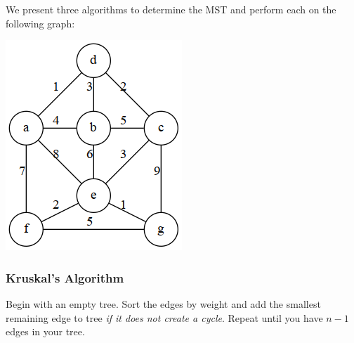 \documentclass[a4paper]{article}
\theoremstyle{definition}
\begin{document}
We present three algorithms to determine the MST and perform each on the following graph:

\begin{center}\includegraphics[scale=0.5]{graphs/minimum-spanning-trees/e_1.png}\end{center}

\subsubsection{Kruskal's Algorithm}
Begin with an empty tree. Sort the edges by weight and add the smallest remaining edge to tree \textit{if it does not create a cycle}. Repeat until you have $n-1$ edges in your tree. 
\setcounter{subfigure}{0}
\end{document}
